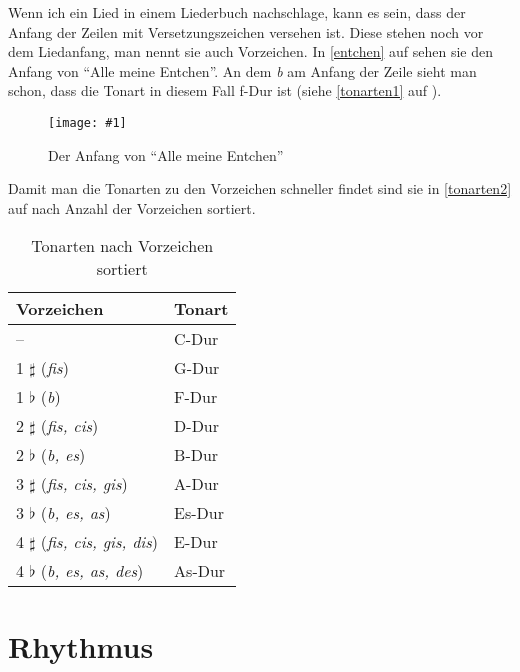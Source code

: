 \documentclass[10pt,a4paper,twoside]{report}
\newcommand{\comment}[1]{
	\marginpar{
		\textsf{#1}
	}
}
\newcommand{\image}[4]{
	\begin{figure}[!ht]
		\centering
		\texttt{[image: \#1]}
		\caption{#2}
		\label{#3}
	\end{figure}
}
\begin{document}
Wenn ich ein Lied in einem Liederbuch nachschlage, kann es sein, dass der Anfang der Zeilen
mit Versetzungszeichen versehen ist. Diese stehen noch vor dem Liedanfang, man nennt sie auch
Vorzeichen.\comment{Vorzeichen} In \autoref{entchen} auf  
sehen sie den Anfang von "`Alle meine Entchen"'. 
An dem \emph{b} am Anfang der Zeile sieht man schon, dass die Tonart in diesem Fall f-Dur ist 
(siehe \autoref{tonarten1} auf ).

\image{lilypond/allemeineentchen.png}{Der Anfang von "`Alle meine Entchen"'}{entchen}{12}

Damit man die Tonarten zu den Vorzeichen schneller findet sind sie in \autoref{tonarten2} 
auf  nach Anzahl der Vorzeichen sortiert.

\begin{table}[!ht]
	\centering
	\begin{tabular}{|p{60mm}|p{20mm}|}
		\hline
		\textbf{Vorzeichen} & \textbf{Tonart}\\
		\hline
		-- & C-Dur\\
		\hline
		1 $\sharp$ (\emph{fis}) & G-Dur\\
		\hline
		1 $\flat$ (\emph{b}) & F-Dur\\
		\hline
		2 $\sharp$ (\emph{fis, cis}) & D-Dur\\
		\hline
		2 $\flat$ (\emph{b, es}) & B-Dur\\
		\hline
		3 $\sharp$ (\emph{fis, cis, gis}) & A-Dur\\
		\hline
		3 $\flat$ (\emph{b, es, as}) & Es-Dur\\
		\hline
		4 $\sharp$ (\emph{fis, cis, gis, dis}) & E-Dur\\
		\hline
		4 $\flat$ (\emph{b, es, as, des}) & As-Dur\\
		\hline
	\end{tabular}
	\caption{Tonarten nach Vorzeichen sortiert}
	\label{tonarten2}
\end{table}

\chapter{Rhythmus}
\end{document}
